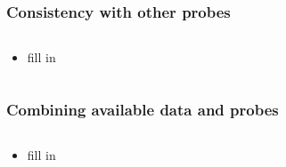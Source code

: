 \documentclass{beamer}
\begin{document}
\frame
{
    \frametitle{Consistency with other probes}


    \begin{columns}
        \begin{column}{0.5\textwidth}    
            \begin{itemize}

                \item fill in

            \end{itemize}
        \end{column}
        \begin{column}{0.5\textwidth}
        \end{column}
    \end{columns}

}

\frame
{
    \frametitle{Combining available data and probes}


    \begin{columns}
        \begin{column}{0.5\textwidth}    
            \begin{itemize}

                \item fill in

            \end{itemize}
        \end{column}
        \begin{column}{0.5\textwidth}
        \end{column}
    \end{columns}

}
\end{document}
